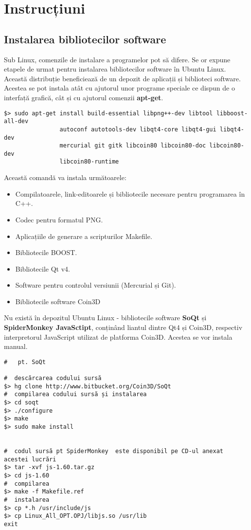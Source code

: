\chapter{Instrucțiuni}


\section{Instalarea bibliotecilor software}

\par Sub Linux, comenzile de instalare a programelor pot să difere. Se or expune etapele de urmat pentru instalarea bibliotecilor software în Ubuntu Linux. Această distribuție beneficiează de un depozit de aplicații și biblioteci software. Acestea se pot instala atât cu ajutorul unor programe speciale ce dispun de o interfață grafică, cât și cu ajutorul comenzii \textbf{apt-get}.

\begin{verbatim}
$> sudo apt-get install build-essential libpng++-dev libtool libboost-all-dev 
                autoconf autotools-dev libqt4-core libqt4-gui libqt4-dev
                mercurial git gitk libcoin80 libcoin80-doc libcoin80-dev 
                libcoin80-runtime    
\end{verbatim}

Această comandă va instala următoarele:
\begin{itemize}
\item Compilatoarele, link-editoarele și bibliotecile necesare pentru programarea în C++.
\item Codec pentru formatul PNG.
\item Aplicațiile de generare a scripturilor Makefile.
\item Bibliotecile BOOST.
\item Bibliotecile Qt v4.
\item Software pentru controlul versiunii (Mercurial și Git).
\item Bibliotecile software Coin3D
\end{itemize}

Nu există în depozitul Ubuntu Linux - bibliotecile software \textbf{SoQt} și \textbf{SpiderMonkey JavaSctipt}, conținând liantul dintre Qt4 și Coin3D, respectiv interpretorul JavaScript utilizat de platforma Coin3D. Acestea se vor instala manual.

\begin{verbatim}
#   pt. SoQt

#  descărcarea codului sursă
$> hg clone http://www.bitbucket.org/Coin3D/SoQt
#  compilarea codului sursă și instalarea
$> cd soqt
$> ./configure
$> make
$> sudo make install


#  codul sursă pt SpiderMonkey  este disponibil pe CD-ul anexat acestei lucrări
$> tar -xvf js-1.60.tar.gz
$> cd js-1.60
#  compilarea
$> make -f Makefile.ref
#  instalarea
$> cp *.h /usr/include/js
$> cp Linux_All_OPT.OPJ/libjs.so /usr/lib
exit    
\end{verbatim}

